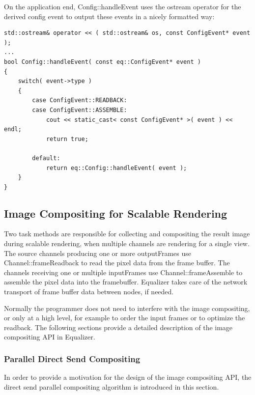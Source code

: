 \documentclass[10pt,a4]{scrartcl}
\begin{document}
On the application end, \textsf{Config::handleEvent} uses the ostream
operator for the derived config event to output these events in a nicely
formatted way:

{\footnotesize\begin{lstlisting}
std::ostream& operator << ( std::ostream& os, const ConfigEvent* event );
...
bool Config::handleEvent( const eq::ConfigEvent* event )
{
    switch( event->type )
    {
        case ConfigEvent::READBACK:
        case ConfigEvent::ASSEMBLE:
            cout << static_cast< const ConfigEvent* >( event ) << endl;
            return true;

        default:
            return eq::Config::handleEvent( event );
    }
}
\end{lstlisting}}%


\subsection{\label{sCompositing}Image Compositing for Scalable Rendering}

Two task methods are responsible for collecting and compositing the
result image during scalable rendering, when multiple channels are
rendering for a single view. The source channels producing one or more
\textsf{outputFrame}s use \textsf{Channel::frameReadback} to read the
pixel data from the frame buffer. The channels receiving one or multiple
\textsf{inputFrame}s use \textsf{Channel::frameAssemb\-le} to assemble
the pixel data into the framebuffer. Equalizer takes care of the network
transport of frame buffer data between nodes, if needed.

Normally the programmer does not need to interfere with the image
compositing, or only at a high level, for example to order the input
frames or to optimize the readback. The following sections provide a
detailed description of the image compositing API in Equalizer.

\subsubsection{Parallel Direct Send Compositing}

In order to provide a motivation for the design of the image compositing
API, the direct send parallel compositing algorithm is introduced in this
section.
\end{document}
